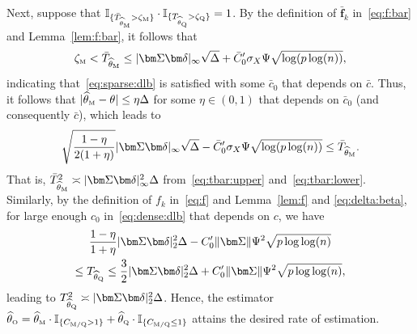 \documentclass[11pt, a4paper]{article}
\newcommand{\mbf}{\mathbf}
\def\wh{\widehat}
\newcommand{\cp}{\theta}
\newcommand{\Mc}{\text{\tiny \upshape M}} %
\newcommand{\Qc}{\text{\tiny \upshape Q}} %
\newcommand{\Oc}{\text{\tiny \upshape O}} %
\theoremstyle{definition}
\theoremstyle{definition}
\theoremstyle{definition}
\theoremstyle{definition}
\theoremstyle{definition}
\theoremstyle{remark}
\theoremstyle{definition}
\theoremstyle{definition}
\theoremstyle{definition}
\begin{document}
Next, suppose that $\mathbb{I}_{\{\bar{T}_{\wh\cp_{\Mc}} > \zeta_{\Mc} \}} \cdot \mathbb{I}_{\{T_{\wh\cp_{\Qc}} > \zeta_{\Qc} \}} = 1$.
By the definition of $\bar{\mbf f}_k$ in~\eqref{eq:f:bar} and Lemma~\ref{lem:f:bar}, it follows that
\begin{align}
\zeta_{\Mc} < \bar{T}_{\wh\cp_{\Mc}} \le \vert \bm\Sigma \bm\delta \vert_\infty\sqrt{\Delta} + \bar{C}_0' \sigma_X \Psi \sqrt{\log(p\log(n))},
\label{eq:tbar:upper}
\end{align}
indicating that~\eqref{eq:sparse:dlb} is satisfied with some $\bar{c}_0$ that depends on $\bar{c}$.
Thus, it follows that $\vert \wh\cp_{\Mc} - \cp \vert \le \eta \Delta$ for some $\eta \in (0, 1)$ that depends on $\bar{c}_0$ (and consequently $\bar{c}$), which leads to
\begin{align}
\sqrt{\frac{1 - \eta}{2(1 + \eta)}} \vert \bm\Sigma \bm\delta \vert_\infty \sqrt{\Delta} - \bar{C}_0' \sigma_X \Psi \sqrt{\log(p\log(n))} \le \bar{T}_{\wh\cp_{\Mc}}.
\label{eq:tbar:lower}
\end{align}
That is, $\bar{T}_{\wh\cp_{\Mc}}^2 \asymp \vert \bm\Sigma \bm\delta \vert_\infty^2 \Delta$ from~\eqref{eq:tbar:upper} and~\eqref{eq:tbar:lower}.
Similarly, by the definition of $f_k$ in~\eqref{eq:f} and Lemma~\ref{lem:f} and \eqref{eq:delta:beta}, for large enough $c_0$ in~\eqref{eq:dense:dlb} that depends on $c$, we have
\begin{multline}
\frac{1 - \eta}{1 + \eta} \vert \bm\Sigma \bm\delta \vert_2^2 \Delta
- C_0' \Vert \bm\Sigma \Vert \Psi^2 \sqrt{p\log\log(n)}
\\
\le T_{\wh\cp_{\Qc}} \le \frac{3}{2} \vert \bm\Sigma \bm\delta \vert_2^2 \Delta + C_0' \Vert \bm\Sigma \Vert \Psi^2 \sqrt{p\log\log(n)},
\label{eq:t:sim}
\end{multline}
leading to $T_{\wh\cp_{\Qc}}^2 \asymp \vert \bm\Sigma \bm\delta \vert_2^2 \Delta$.
Hence, the estimator $\wh\cp_{\Oc} = \wh\cp_{\Mc} \cdot \mathbb{I}_{\{C_{\Mc/\Qc} > 1 \}} + \wh\cp_{\Qc} \cdot \mathbb{I}_{\{C_{\Mc/\Qc} \le 1 \}}$ attains the desired rate of estimation.
\end{document}
